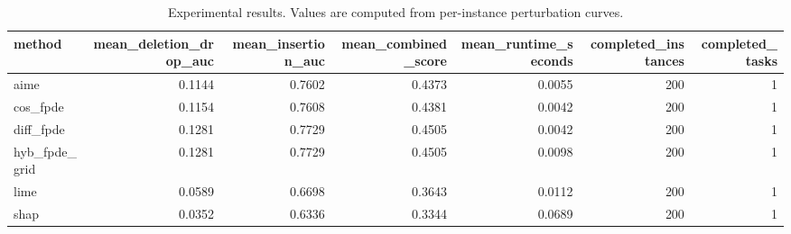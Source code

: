 \begin{table}[t]
\caption{Experimental results. Values are computed from per-instance perturbation curves.}
\label{tab:main_results_computed}
\centering
\begin{tabular}{lrrrrrr}
\toprule
method & mean\_deletion\_drop\_auc & mean\_insertion\_auc & mean\_combined\_score & mean\_runtime\_seconds & completed\_instances & completed\_tasks \\
\midrule
aime & 0.1144 & 0.7602 & 0.4373 & 0.0055 & 200 & 1 \\
cos\_fpde & 0.1154 & 0.7608 & 0.4381 & 0.0042 & 200 & 1 \\
diff\_fpde & 0.1281 & 0.7729 & 0.4505 & 0.0042 & 200 & 1 \\
hyb\_fpde\_grid & 0.1281 & 0.7729 & 0.4505 & 0.0098 & 200 & 1 \\
lime & 0.0589 & 0.6698 & 0.3643 & 0.0112 & 200 & 1 \\
shap & 0.0352 & 0.6336 & 0.3344 & 0.0689 & 200 & 1 \\
\bottomrule
\end{tabular}

\end{table}
